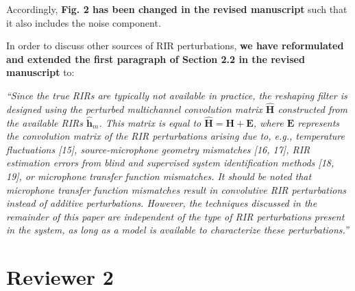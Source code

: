 \documentclass[10pt, a4paper]{article}
\begin{document}
\begin{itemize}
Accordingly, {\textbf{Fig. 2 has been changed in the revised manuscript}} such that it also includes the noise component.

In order to discuss other sources of RIR perturbations, {\textbf{we have reformulated and extended the first paragraph of Section 2.2 in the revised manuscript}} to:

{\emph{``Since the true RIRs are typically not available in practice, the reshaping filter is designed using the perturbed multichannel convolution matrix $\hat{\mathbf{H}}$ constructed from the available RIRs $\hat{\mathbf{h}}_m$.
This matrix is equal to $\hat{\mathbf{H}} = \mathbf{H} + \mathbf{E}$, where $\mathbf{E}$ represents the convolution matrix of the RIR perturbations arising due to, e.g., temperature fluctuations [15], source-microphone geometry mismatches [16, 17], RIR estimation errors from blind and supervised system identification methods [18, 19], or microphone transfer function mismatches.
It should be noted that microphone transfer function mismatches result in convolutive RIR perturbations instead of additive perturbations. However, the techniques discussed in the remainder of this paper are independent of the type of RIR perturbations present in the system, as long as a model is available to characterize these perturbations.''}}

\end{itemize}

\section{Reviewer 2}
\end{document}
